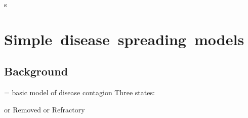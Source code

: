   

s

\section{Simple\ disease\ spreading\ models}

\subsection{Background}

%
%
%





    
     = basic model of disease contagion
     Three states:
      
        { or Removed or Refractory}
      
